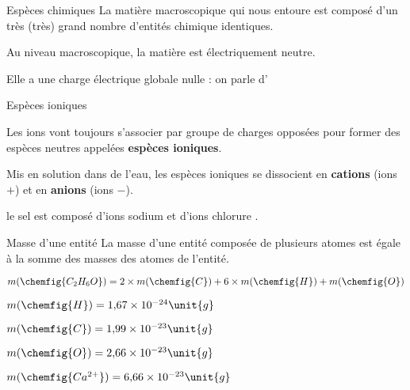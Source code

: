 \begin{doc}{Espèces chimiques}
  La matière macroscopique qui nous entoure est composé d'un très (très) grand nombre d'entités chimique identiques.
  
  \begin{encart}
    Au niveau macroscopique, la matière est électriquement neutre.
  \end{encart}
  
  Elle a une charge électrique globale nulle : on parle d'
\end{doc}

\begin{doc}{Espèces ioniques}
  \vspace*{-24pt}
  \begin{encart}
    Les ions vont toujours s'associer par groupe de charges opposées pour former des espèces neutres appelées \textbf{espèces ioniques}.
  \end{encart}
  
  Mis en solution dans de l'eau, les espèces ioniques se dissocient en \textbf{cations} (ions $+$) et en \textbf{anions} (ions $-$).
  
  \exemple le sel est composé d'ions sodium  et d'ions chlorure .
\end{doc}



\begin{doc}{Masse d'une entité}
  \label{doc:masse_entite}
  La masse d'une entité composée de plusieurs atomes est égale à la somme des masses des atomes de l'entité.
  
  \exemple 
  $m(\chemfig{C_2 H_6 O}) = 2\times m(\chemfig{C}) + 6\times m(\chemfig{H}) + m(\chemfig{O})$
  

  \begin{multicols}{2}
    \begin{donnees}
      \item $m(\chemfig{H}) = 1,\!67 \times 10^{-24} \unit{g}$
      \item $m(\chemfig{C}) = 1,\!99 \times 10^{-23} \unit{g}$
      \item[\phantom{.}] 
      \item $m(\chemfig{O}) = 2,\!66 \times 10^{-23} \unit{g}$
      \item $m(\chemfig{Ca^{2+}}) = 6,\!66 \times 10^{-23} \unit{g}$
    \end{donnees}
  \end{multicols}
\end{doc}

